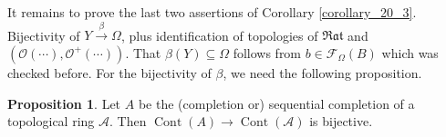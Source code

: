 \documentclass[10pt]{article}
\numberwithin{equation}{section}
\theoremstyle{definition}
\newtheorem{proposition}{Proposition}[subsection]
\DeclareMathOperator{\Cont}{Cont}
\newcommand{\Ouv}{\mathscr{O}}
\newcommand{\Rat}[0]{\mathfrak{Rat}}
\begin{document}
\par It remains to prove the last two assertions of Corollary \ref{corollary_20_3}. Bijectivity of $Y\stackrel{\beta}{\to}\Omega$, plus identification of topologies of $\Rat$ and $(\Ouv(\cdots),\Ouv^+(\cdots))$. That $\beta(Y)\subseteq\Omega$ follows from $b\in\mathcal{F}_\Omega(B)$ which was checked before. For the bijectivity of $\beta$, we need the following proposition.
\begin{proposition}
    \label{proposition_21_4}
    Let $A$ be the (completion or) sequential completion of a topological ring $\mathcal{A}$. Then $\Cont(A)\to \Cont(\mathcal{A})$ is bijective.
\end{proposition}
\end{document}
